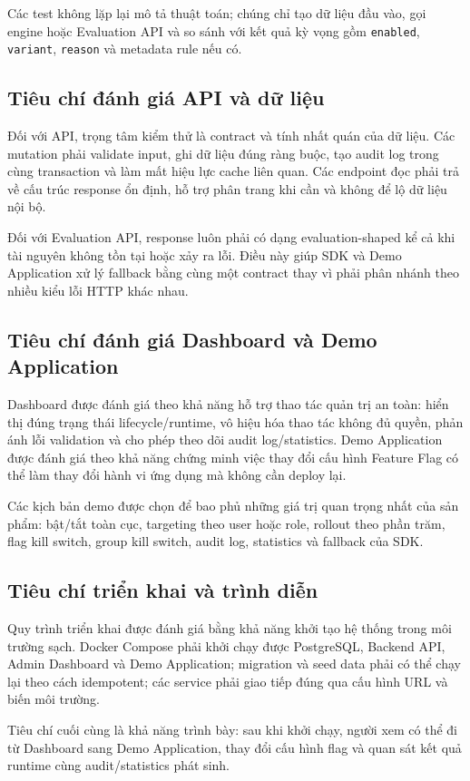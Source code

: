 Các test không lặp lại mô tả thuật toán; chúng chỉ tạo dữ liệu đầu vào, gọi engine hoặc Evaluation API và so sánh với kết quả kỳ vọng gồm \texttt{enabled}, \texttt{variant}, \texttt{reason} và metadata rule nếu có.

\subsection{Tiêu chí đánh giá API và dữ liệu}

Đối với API, trọng tâm kiểm thử là contract và tính nhất quán của dữ liệu. Các mutation phải validate input, ghi dữ liệu đúng ràng buộc, tạo audit log trong cùng transaction và làm mất hiệu lực cache liên quan. Các endpoint đọc phải trả về cấu trúc response ổn định, hỗ trợ phân trang khi cần và không để lộ dữ liệu nội bộ.

Đối với Evaluation API, response luôn phải có dạng evaluation-shaped kể cả khi tài nguyên không tồn tại hoặc xảy ra lỗi. Điều này giúp SDK và Demo Application xử lý fallback bằng cùng một contract thay vì phải phân nhánh theo nhiều kiểu lỗi HTTP khác nhau.

\subsection{Tiêu chí đánh giá Dashboard và Demo Application}

Dashboard được đánh giá theo khả năng hỗ trợ thao tác quản trị an toàn: hiển thị đúng trạng thái lifecycle/runtime, vô hiệu hóa thao tác không đủ quyền, phản ánh lỗi validation và cho phép theo dõi audit log/statistics. Demo Application được đánh giá theo khả năng chứng minh việc thay đổi cấu hình Feature Flag có thể làm thay đổi hành vi ứng dụng mà không cần deploy lại.

Các kịch bản demo được chọn để bao phủ những giá trị quan trọng nhất của sản phẩm: bật/tắt toàn cục, targeting theo user hoặc role, rollout theo phần trăm, flag kill switch, group kill switch, audit log, statistics và fallback của SDK.

\subsection{Tiêu chí triển khai và trình diễn}

Quy trình triển khai được đánh giá bằng khả năng khởi tạo hệ thống trong môi trường sạch. Docker Compose phải khởi chạy được PostgreSQL, Backend API, Admin Dashboard và Demo Application; migration và seed data phải có thể chạy lại theo cách idempotent; các service phải giao tiếp đúng qua cấu hình URL và biến môi trường.

Tiêu chí cuối cùng là khả năng trình bày: sau khi khởi chạy, người xem có thể đi từ Dashboard sang Demo Application, thay đổi cấu hình flag và quan sát kết quả runtime cùng audit/statistics phát sinh.
